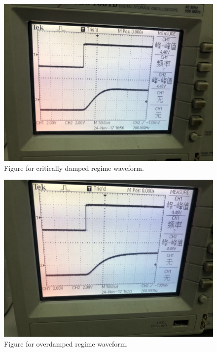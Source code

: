 \documentclass[12pt]{article}
\begin{document}
\begin{figure}[H]
\centering
\includegraphics[scale=0.25]{P8.jpg}
\caption{Figure for critically damped regime waveform.}
\end{figure}
\begin{figure}[H]
\centering
\includegraphics[scale=0.25]{P9.jpg}
\caption{Figure for overdamped regime waveform.}
\end{figure}
\end{document}
